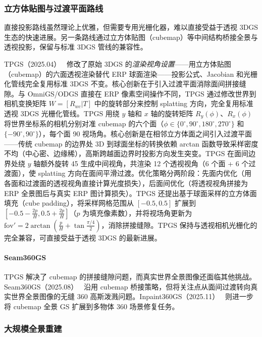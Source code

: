 \subsubsection{立方体贴图与过渡平面路线}

直接投影路线虽然理论上优雅，但需要专用光栅化器，难以直接受益于透视 3DGS 生态的快速进展。另一条路线通过立方体贴图（cubemap）等中间结构桥接全景与透视投影，保留与标准 3DGS 管线的兼容性。

TPGS（2025.04）~\cite{2504_09062} 修改了原始 3DGS 的\emph{渲染视角设置}——用立方体贴图（cubemap）的六面透视渲染替代 ERP 球面渲染——投影公式、Jacobian 和光栅化管线完全复用标准 3DGS 不变。核心创新在于引入过渡平面消除面间拼接缝隙。与 OmniGS/ODGS 直接在 ERP 像素空间操作不同，TPGS 通过修改世界到相机变换矩阵 $W = [R_{wc}|T]$ 中的旋转部分来控制 splatting 方向，完全复用标准透视 3DGS 光栅化管线。TPGS 用绕 $y$ 轴和 $x$ 轴的旋转矩阵 $R_y(\phi)$、$R_x(\phi)$ 将世界坐标系的相机分别对准 cubemap 的六个面（$\phi \in \{0^\circ, 90^\circ, 180^\circ, 270^\circ\}$ 和 $\{-90^\circ, 90^\circ\}$），每个面 90\textdegree{} 视场角。核心创新是在相邻立方体面之间引入过渡平面——传统 cubemap 的边界处 3D 到球面坐标的转换依赖 arctan 函数导致采样密度不均（中心密、边缘稀），高斯跨越面边界时投影方向发生突变。TPGS 在面间边界处绕 $y$ 轴额外旋转 45\textdegree{} 生成中间视角，共渲染 12 个透视视角（6 个面 + 6 个过渡面），使 splatting 方向在面间平滑过渡。优化策略分两阶段：先面内优化（用各面和过渡面的透视视角直接计算光度损失），后面间优化（将透视视角拼接为 ERP 全景图后与真实 ERP 图计算损失）。TPGS 还提出基于球面采样的立方体面填充（cube padding），将采样网格范围从 $[-0.5, 0.5]$ 扩展到 $[-0.5 - \frac{2p}{H}, 0.5 + \frac{2p}{H}]$（$p$ 为填充像素数），并将视场角更新为 $\text{fov}' = 2\arctan(\frac{p}{H} + \tan\frac{\pi/4}{2})$，消除拼接缝隙。TPGS 保持与透视相机光栅化的完全兼容，可直接受益于透视 3DGS 的最新进展。

\paragraph{Seam360GS}
TPGS 解决了 cubemap 的拼接缝隙问题，而真实世界全景图像还面临其他挑战。Seam360GS（2025.08）~\cite{2508_20080} 沿用 cubemap 桥接策略，但将关注点从面间过渡转向真实世界全景图像的无缝 360\textdegree{} 高斯泼溅问题。Inpaint360GS（2025.11）~\cite{2511_06457} 则进一步将 cubemap 全景 GS 扩展到多物体 360\textdegree{} 场景修复任务。

\subsubsection{大规模全景重建}

